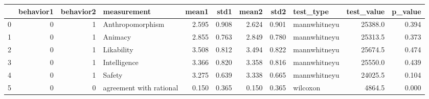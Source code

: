 \begin{tabular}{lrrlrrrrlrr}
\toprule
{} &  behavior1 &  behavior2 &              measurement &  mean1 &   std1 &  mean2 &   std2 &     test\_type &  test\_value &  p\_value \\
\midrule
0 &          0 &          1 &         Anthropomorphism &  2.595 &  0.908 &  2.624 &  0.901 &  mannwhitneyu &     25388.0 &    0.394 \\
1 &          0 &          1 &                  Animacy &  2.855 &  0.763 &  2.849 &  0.780 &  mannwhitneyu &     25313.5 &    0.373 \\
2 &          0 &          1 &               Likability &  3.508 &  0.812 &  3.494 &  0.822 &  mannwhitneyu &     25674.5 &    0.474 \\
3 &          0 &          1 &             Intelligence &  3.366 &  0.820 &  3.358 &  0.816 &  mannwhitneyu &     25550.0 &    0.439 \\
4 &          0 &          1 &                   Safety &  3.275 &  0.639 &  3.338 &  0.665 &  mannwhitneyu &     24025.5 &    0.104 \\
5 &          0 &          0 &  agreement with rational &  0.150 &  0.365 &  0.150 &  0.365 &      wilcoxon &      4864.5 &    0.000 \\
\bottomrule
\end{tabular}
